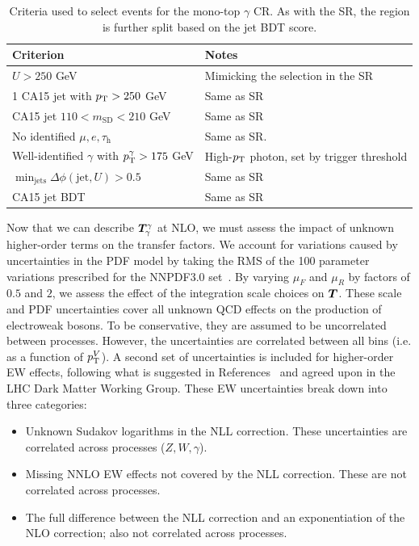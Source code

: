 \begin{table}[]
    \caption{Criteria used to select events for the mono-top $\gamma$ CR. As with the SR, the region is further split based on the jet BDT score.}
    \label{tab:mt:pho_cuts}
    \centering
    \begin{tabular}{p{}p{}}
        Criterion & Notes \\
        \hline
        \hline
        $U>250$ GeV & Mimicking the selection in the SR\\
        1 CA15 jet with $p_\mathrm{T}>250$ GeV &  Same as SR \\
        CA15 jet $110 < m_\mathrm{SD} < 210$ GeV & Same as SR \\
        \hline
        No identified $\mu,e,\tau_\mathrm{h}$ & Same as SR. \\
        Well-identified $\gamma$ with $p_\mathrm{T}^\gamma>175$ GeV & High-$p_\mathrm{T}$ photon, set by trigger threshold \\
        \hline
        $\min_\mathrm{jets}\Delta\phi(\mathrm{jet},U) > 0.5$ & Same as SR \\
        \hline
        CA15 jet BDT & Same as SR\\
    \end{tabular}
\end{table}

Now that we can describe $\bm{T}^{\gamma}_{\gamma}$ at NLO, we must assess the impact of unknown higher-order terms on the transfer factors.
We account for variations caused by uncertainties in the PDF model by taking the RMS of the 100 parameter variations prescribed for the NNPDF3.0 set~\cite{nnpdf}.
By varying $\mu_F$ and $\mu_R$ by factors of $0.5$ and $2$, we assess the effect of the integration scale choices on $\bm{T}^{}_{}$.
These scale and PDF uncertainties cover all unknown QCD effects on the production of electroweak bosons.
To be conservative, they are assumed to be uncorrelated between processes.
However, the uncertainties are correlated between all bins (i.e. as a function of $p_\mathrm{T}^V$).
A second set of uncertainties is included for higher-order EW effects, following what is suggested in References~\cite{ewk5,ewk4,ewk6,ewk2,ewk3,ewk9,ewk8,ewk1,ewk7} and agreed upon in the LHC Dark Matter Working Group.
These EW uncertainties break down into three categories:
\begin{itemize}
    \item Unknown Sudakov logarithms in the NLL correction. These uncertainties are correlated across processes ($Z,W,\gamma$).
    \item Missing NNLO EW effects not covered by the NLL correction. These are not correlated across processes.
    \item The full difference between the NLL correction and an exponentiation of the NLO correction; also not correlated across processes.
\end{itemize}

